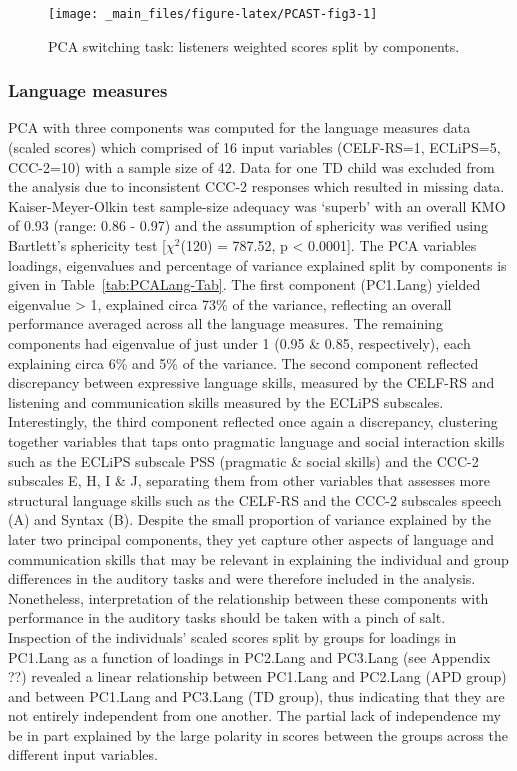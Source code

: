 \documentclass[a4paper, twoside]{templates/ociamthesis}
\begin{document}
\begin{figure}

{\centering \texttt{[image: \_main\_files/figure-latex/PCAST-fig3-1]} 

}

\caption{PCA switching task: listeners weighted scores split by components.}\label{fig:PCAST-fig3}
\end{figure}

\hypertarget{language-measures}{%
\subsubsection{Language measures}\label{language-measures}}

PCA with three components was computed for the language measures data (scaled scores) which comprised of 16 input variables (CELF-RS=1, ECLiPS=5, CCC-2=10) with a sample size of 42. Data for one TD child was excluded from the analysis due to inconsistent CCC-2 responses which resulted in missing data. Kaiser-Meyer-Olkin test sample-size adequacy was `superb' with an overall KMO of 0.93 (range: 0.86 - 0.97) and the assumption of sphericity was verified using Bartlett's sphericity test {[}\(\chi^2\)(120) = 787.52, p \textless{} 0.0001{]}. The PCA variables loadings, eigenvalues and percentage of variance explained split by components is given in Table~\ref{tab:PCALang-Tab}. The first component (PC1.Lang) yielded eigenvalue \textgreater{} 1, explained circa 73\% of the variance, reflecting an overall performance averaged across all the language measures. The remaining components had eigenvalue of just under 1 (0.95 \& 0.85, respectively), each explaining circa 6\% and 5\% of the variance. The second component reflected discrepancy between expressive language skills, measured by the CELF-RS and listening and communication skills measured by the ECLiPS subscales. Interestingly, the third component reflected once again a discrepancy, clustering together variables that taps onto pragmatic language and social interaction skills such as the ECLiPS subscale PSS (pragmatic \& social skills) and the CCC-2 subscales E, H, I \& J, separating them from other variables that assesses more structural language skills such as the CELF-RS and the CCC-2 subscales speech (A) and Syntax (B). Despite the small proportion of variance explained by the later two principal components, they yet capture other aspects of language and communication skills that may be relevant in explaining the individual and group differences in the auditory tasks and were therefore included in the analysis. Nonetheless, interpretation of the relationship between these components with performance in the auditory tasks should be taken with a pinch of salt. Inspection of the individuals' scaled scores split by groups for loadings in PC1.Lang as a function of loadings in PC2.Lang and PC3.Lang (see Appendix ??) revealed a linear relationship between PC1.Lang and PC2.Lang (APD group) and between PC1.Lang and PC3.Lang (TD group), thus indicating that they are not entirely independent from one another. The partial lack of independence my be in part explained by the large polarity in scores between the groups across the different input variables.
\end{document}
